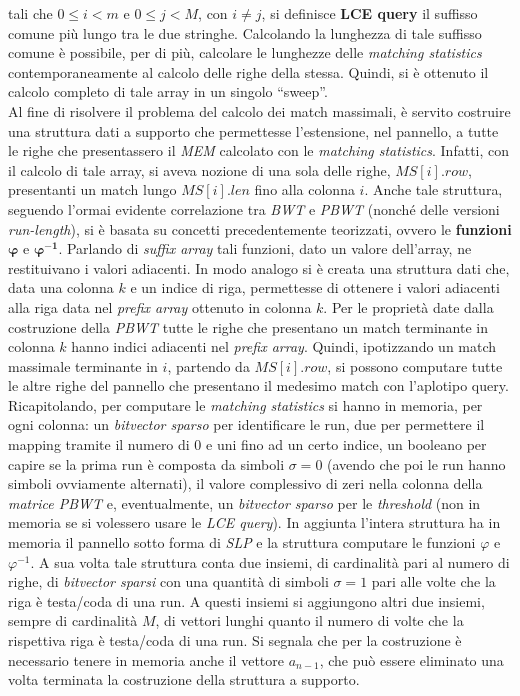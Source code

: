 \documentclass[a4paper,11pt, oneside]{article}
\begin{document}
tali che $0\leq i <m$ e $0\leq j <M$, con $i\neq j$, si definisce \textbf{LCE
  query} il suffisso comune più lungo tra le due stringhe. Calcolando la
lunghezza di tale suffisso comune è possibile, per di più, calcolare le
lunghezze delle \textit{matching statistics} contemporaneamente al calcolo delle
righe della stessa. Quindi, si è ottenuto il calcolo completo di tale array in
un singolo ``sweep''.\\
Al fine di risolvere il problema del calcolo dei match massimali, è servito
costruire una struttura dati a supporto che permettesse l'estensione, nel
pannello, a tutte le righe che presentassero il \textit{MEM} calcolato con le
\textit{matching statistics}. Infatti, con il calcolo di tale array, si aveva
nozione di una sola delle righe, $MS[i].row$, presentanti un match lungo
$MS[i].len$ fino alla colonna $i$. Anche tale struttura, seguendo l'ormai
evidente correlazione tra \textit{BWT} e \textit{PBWT} (nonché delle versioni
\textit{run-length}), si è basata su concetti precedentemente teorizzati, ovvero
le \textbf{funzioni} $\boldsymbol\varphi$ e
$\boldsymbol\varphi^{\mathbf{-1}}$. Parlando di \textit{suffix array} tali
funzioni, dato un valore dell'array, ne restituivano i valori adiacenti. In modo
analogo si è creata una struttura dati che, data una colonna $k$ e un indice di
riga, permettesse di ottenere i valori adiacenti alla riga data nel
\textit{prefix array} ottenuto in colonna $k$. Per le proprietà date dalla
costruzione della \textit{PBWT} tutte le righe che presentano un match
terminante in colonna $k$ hanno indici adiacenti nel \textit{prefix
  array}. Quindi, ipotizzando un match massimale terminante in $i$, partendo da
$MS[i].row$, si possono computare tutte le altre righe del pannello che
presentano il medesimo match con l'aplotipo query.\\
Ricapitolando, per computare le \textit{matching statistics} si hanno in
memoria, per ogni colonna: un \textit{bitvector sparso} per identificare le run,
due per permettere il mapping tramite il numero di 0 e uni fino ad un certo
indice, un booleano per capire se la prima run è composta da simboli $\sigma=0$
(avendo che poi le run hanno simboli ovviamente alternati), il valore
complessivo di zeri nella colonna della \textit{matrice PBWT} e, eventualmente,
un \textit{bitvector sparso} per le \textit{threshold} (non in memoria se si
volessero usare le \textit{LCE query}). In aggiunta l'intera struttura ha in
memoria il pannello sotto forma di \textit{SLP} e la struttura computare le
funzioni $\varphi$ e $\varphi^{-1}$. A sua volta tale struttura conta due
insiemi, di cardinalità pari al 
numero di righe, di \textit{bitvector sparsi} con una quantità di simboli
$\sigma=1$ pari alle volte che la riga è testa/coda di una run. A questi insiemi
si aggiungono altri due insiemi, sempre di cardinalità $M$, di vettori lunghi
quanto il numero di volte che la rispettiva riga è testa/coda di una run. Si
segnala che per la costruzione è necessario tenere in memoria anche il vettore
$a_{n-1}$, che può essere eliminato una volta terminata la costruzione della
struttura a supporto.
\end{document}

